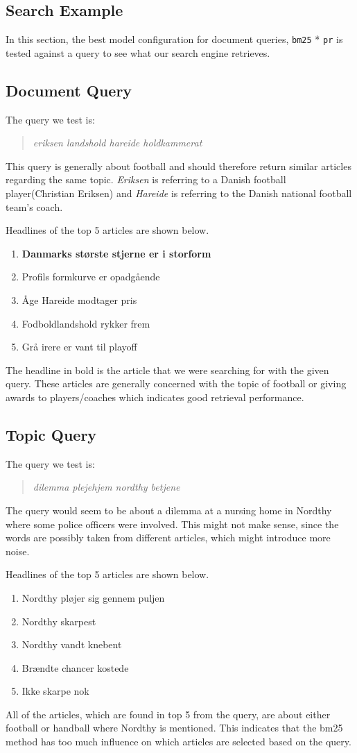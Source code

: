 \subsection{Search Example}
In this section, the best model configuration for document queries, \texttt{\gls{bm25}} * \texttt{\gls{pr}} is tested against a query to see what our search engine retrieves.


\subsection{Document Query}
The query we test is:
\begin{quotation}
	\textit{eriksen landshold hareide holdkammerat}
\end{quotation}
This query is generally about football and should therefore return similar articles regarding the same topic.
\textit{Eriksen} is referring to a Danish football player(Christian Eriksen) and \textit{Hareide} is referring to the Danish national football team's coach.


\noindent Headlines of the top 5 articles are shown below.
\begin{enumerate}
	\item \textbf{Danmarks største stjerne er i storform}
	\item Profils formkurve er opadgående
	\item Åge Hareide modtager pris
	\item Fodboldlandshold rykker frem
	\item Grå irere er vant til playoff
\end{enumerate}
The headline in bold is the article that we were searching for with the given query. 
These articles are generally concerned with the topic of football or giving awards to players/coaches which indicates good retrieval performance.


\subsection{Topic Query}
The query we test is:
\begin{quotation}
	\textit{dilemma plejehjem nordthy betjene}
\end{quotation}
The query would seem to be about a dilemma at a nursing home in Nordthy where some police officers were involved. 
This might not make sense, since the words are possibly taken from different articles, which might introduce more noise.

\noindent Headlines of the top 5 articles are shown below.
\begin{enumerate}
	\item Nordthy pløjer sig gennem puljen
	\item Nordthy skarpest
	\item Nordthy vandt knebent
	\item Brændte chancer kostede
	\item Ikke skarpe nok
\end{enumerate}
All of the articles, which are found in top 5 from the query, are about either football or handball where Nordthy is mentioned.
This indicates that the \gls{bm25} method has too much influence on which articles are selected based on the query.
